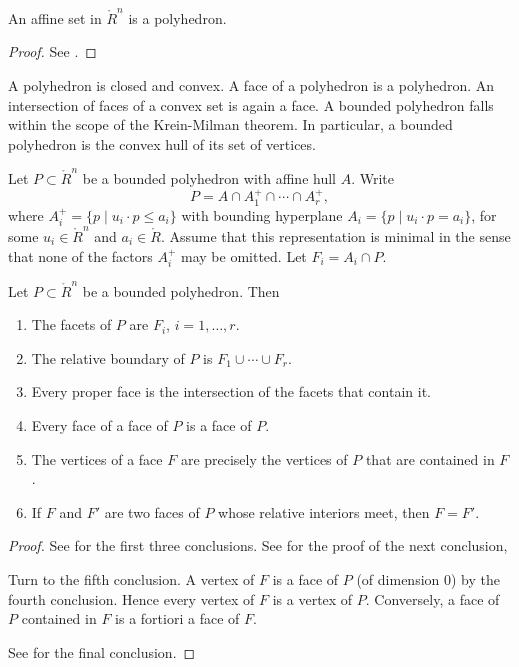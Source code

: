 \begin{lemma}\label{lemma:aff-poly}
An affine set in $\ring{R}^n$ is a polyhedron.
\end{lemma}

\begin{proof} See \cite[Cor~1.4.2]{webster:1994}.
\end{proof}

A polyhedron is closed and convex.  A face of a polyhedron is a polyhedron.  An intersection of faces of a convex set is again a face.  A bounded polyhedron falls within the scope of the Krein-Milman theorem.  In particular, a bounded polyhedron is the convex hull of its set of vertices.
%

Let $P\subset\ring{R}^n$ be a bounded polyhedron with affine hull $A$. Write 
$$
P = A \cap A^+_1 \cap \cdots \cap A^+_r,
$$
where
$A^+_i = \{p\mid u_i\cdot p \le a_i\}$ with bounding hyperplane
$A_i=\{p\mid u_i \cdot p = a_i\}$, for some $u_i\in \ring{R}^n$ and $a_i\in\ring{R}$. 
Assume that this representation is minimal in the sense that none of the factors $A^+_i$ may be omitted.  Let $F_i = A_i\cap P$.
%


\begin{lemma}\label{lemma:webster}  
Let $P\subset\ring{R}^n$ be a bounded polyhedron.  Then
%
\begin{enumerate}
\item The facets of $P$ are $F_i$, $i=1,\ldots,r$.
\item The relative boundary of $P$ is $F_1\cup\cdots \cup F_r$.
\item Every proper face is the intersection of the facets that contain it.
\item Every face of a face of $P$ is a face of $P$.
\item The vertices of a face $F$ are precisely the vertices of $P$ that are contained in $F$.
\item If $F$ and $F'$ are two faces of $P$ whose relative interiors meet, then
$F=F'$.
\end{enumerate}
\end{lemma}
%
%
%

\begin{proof} See \cite[Thm~3.2.1]{webster:1994} for the first three conclusions.
See \cite[Th~2.6.5]{webster:1994} for the proof of the next conclusion,

Turn to the fifth conclusion.  A vertex of $F$ is a face of $P$ (of dimension $0$) by the fourth conclusion.  Hence every vertex of $F$ is a vertex of $P$.  Conversely, a face of $P$ contained in $F$ is a fortiori a face of $F$.

See \cite[Cor~2.6.7]{webster:1994} for the final conclusion.
\end{proof}

